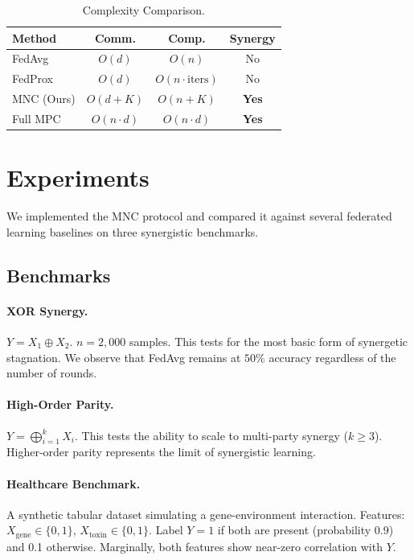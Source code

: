 \documentclass{article}
\theoremstyle{plain}
\theoremstyle{definition}
\begin{document}
\begin{table}[t]
\caption{Complexity Comparison.}
\label{tab:complexity}
\begin{center}
\begin{small}
\begin{sc}
\setlength{\tabcolsep}{2pt}
\begin{tabular}{lccc}
\toprule
Method & Comm. & Comp. & Synergy \\
\midrule
FedAvg & $O(d)$ & $O(n)$ & No \\
FedProx & $O(d)$ & $O(n \cdot \text{iters})$ & No \\
MNC (Ours) & $O(d + K)$ & $O(n + K)$ & \textbf{Yes} \\
Full MPC & $O(n \cdot d)$ & $O(n \cdot d)$ & \textbf{Yes} \\
\bottomrule
\end{tabular}
\end{sc}
\end{small}
\end{center}
\end{table}

\section{Experiments}
\label{sec:experiments}
We implemented the MNC protocol and compared it against several federated learning baselines on three synergistic benchmarks.

\subsection{Benchmarks}
\paragraph{XOR Synergy.} $Y = X_1 \oplus X_2$. $n=2,000$ samples. This tests for the most basic form of synergetic stagnation. We observe that FedAvg remains at $50\%$ accuracy regardless of the number of rounds.
\paragraph{High-Order Parity.} $Y = \bigoplus_{i=1}^k X_i$. This tests the ability to scale to multi-party synergy ($k \ge 3$). Higher-order parity represents the limit of synergistic learning.
\paragraph{Healthcare Benchmark.} A synthetic tabular dataset simulating a gene-environment interaction. Features: $X_{\text{gene}} \in \{0, 1\}$, $X_{\text{toxin}} \in \{0, 1\}$. Label $Y=1$ if both are present (probability 0.9) and 0.1 otherwise. Marginally, both features show near-zero correlation with $Y$.
\end{document}
